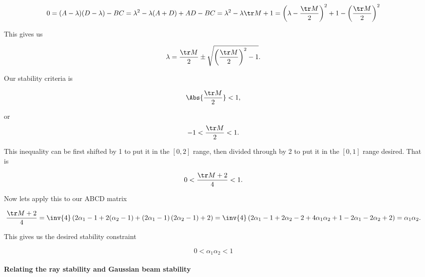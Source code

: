 {\begin{dmath}\label{eqn:problemSet4Problem2:940}
0 
= (A - \lambda)(D - \lambda) - B C
= \lambda^2 - \lambda( A + D ) + A D - BC
= \lambda^2 - \lambda \tr M + 1
= \left(\lambda - \frac{\tr M}{2}\right)^2 + 1 - \left(\frac{\tr M}{2}\right)^2 
\end{dmath}

This gives us

\begin{dmath}\label{eqn:problemSet4Problem2:960}
\lambda = 
\frac{\tr M}{2} \pm \sqrt{ \left(\frac{\tr M}{2}\right)^2 - 1 }.
\end{dmath}

Our stability criteria is

\begin{dmath}\label{eqn:problemSet4Problem2:980}
\Abs{ \frac{\tr M}{2} } < 1,
\end{dmath}

or
\begin{equation}\label{eqn:problemSet4Problem2:1000}
-1 < \frac{\tr M}{2} < 1.
\end{equation}

This inequality can be first shifted by 1 to put it in the $[0,2]$ range, then divided through by 2 to put it in the $[0, 1]$ range desired.  That is


\begin{equation}\label{eqn:problemSet4Problem2:1020}
0 < \frac{\tr M + 2 }{4} < 1.
\end{equation}

Now lets apply this to our ABCD matrix 

\begin{dmath}\label{eqn:problemSet4Problem2:1040}
\frac{\tr M + 2 }{4} 
=
\inv{4}
\left( 
2 \alpha_1 - 1 
+
2(\alpha_2 - 1) + 
\left(
2 \alpha_1 - 1
\right)
\left(
2 \alpha_2 - 1
\right)
+ 2 
\right)
=
\inv{4}
\left( 
2 \alpha_1 - 1 
+
2 \alpha_2 - 2 + 
4 \alpha_1 \alpha_2 + 1 - 2 \alpha_1 - 2 \alpha_2
+ 2 
\right)
=
\alpha_1 \alpha_2.
\end{dmath}

This gives us the desired stability constraint

\begin{equation}\label{eqn:problemSet4Problem2:1060}
\boxed{
0 < \alpha_1 \alpha_2 < 1
}
\end{equation}

\paragraph{Relating the ray stability and Gaussian beam stability}

}

